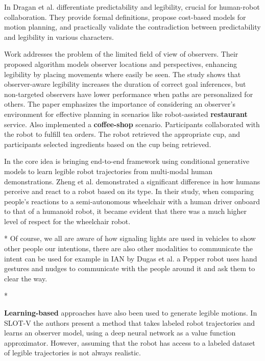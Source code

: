 In \cite{dragan2013legibility} Dragan et al. differentiate predictability and legibility, crucial for human-robot collaboration. They provide formal definitions, propose cost-based models for motion planning, and practically validate the contradiction between predictability and legibility in various characters.

Work \cite{taylor2022observeraware} addresses the problem of the limited field of view of observers. Their proposed algorithm models observer locations and perspectives, enhancing legibility by placing movements where easily be seen. The study shows that observer-aware legibility increases the duration of correct goal inferences, but non-targeted observers have lower performance when paths are personalized for others. The paper emphasizes the importance of considering an observer's environment for effective planning in scenarios like robot-assisted \textbf{restaurant} service. Also \cite{dragan2015effects} implemented a \textbf{coffee-shop} scenario. Participants collaborated with the robot to fulfill tea orders. The robot retrieved the appropriate cup, and participants selected ingredients based on the cup being retrieved.

In \cite{bronars2023_GLMM} the core idea is bringing end-to-end framework using conditional generative models to learn legible robot trajectories from multi-modal human demonstrations. 
%
Zheng et al. \cite{PAT2021IJSR} demonstrated a significant difference in how humans perceive and react to a robot based on its type. In their study, when comparing people's reactions to a semi-autonomous wheelchair with a human driver onboard to that of a humanoid robot, it became evident that there was a much higher level of respect for the wheelchair robot.

* Of course, we all are aware of how signaling lights are used in vehicles to show other people our intentions, there are also other modalities to communicate the intent can be used for example in IAN by Dugas et al. \cite{dugas2020_IAN} a Pepper robot uses hand gestures and nudges to communicate with the people around it and ask them to clear the way. 

* \cite{fukuchi2009focus}

\textbf{Learning-based} approaches have also been used to generate legible motions.
In SLOT-V \cite{XXX} the authors present a method that takes labeled robot trajectories and learns an observer model, using a deep neural network as a value function approximator.
However, assuming that the robot has access to a labeled dataset of legible trajectories is not always realistic.